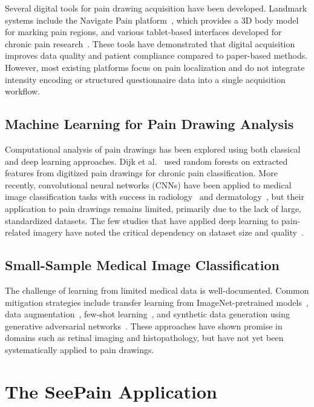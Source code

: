 \documentclass[conference]{IEEEtran}
\begin{document}
Several digital tools for pain drawing acquisition have been developed. Landmark systems include the Navigate Pain platform~\cite{boudreau2016}, which provides a 3D body model for marking pain regions, and various tablet-based interfaces developed for chronic pain research~\cite{barbero2015}. These tools have demonstrated that digital acquisition improves data quality and patient compliance compared to paper-based methods. However, most existing platforms focus on pain localization and do not integrate intensity encoding or structured questionnaire data into a single acquisition workflow.

\subsection{Machine Learning for Pain Drawing Analysis}

Computational analysis of pain drawings has been explored using both classical and deep learning approaches. Dijk et al.~\cite{vandijk2017} used random forests on extracted features from digitized pain drawings for chronic pain classification. More recently, convolutional neural networks (CNNs) have been applied to medical image classification tasks with success in radiology~\cite{rajpurkar2017} and dermatology~\cite{esteva2017}, but their application to pain drawings remains limited, primarily due to the lack of large, standardized datasets. The few studies that have applied deep learning to pain-related imagery have noted the critical dependency on dataset size and quality~\cite{boudreau2016}.

\subsection{Small-Sample Medical Image Classification}

The challenge of learning from limited medical data is well-documented. Common mitigation strategies include transfer learning from ImageNet-pretrained models~\cite{tajbakhsh2016}, data augmentation~\cite{shorten2019}, few-shot learning~\cite{prabhu2019}, and synthetic data generation using generative adversarial networks~\cite{frid2018}. These approaches have shown promise in domains such as retinal imaging and histopathology, but have not yet been systematically applied to pain drawings.

\section{The SeePain Application}
\label{sec:seepain}
\end{document}
